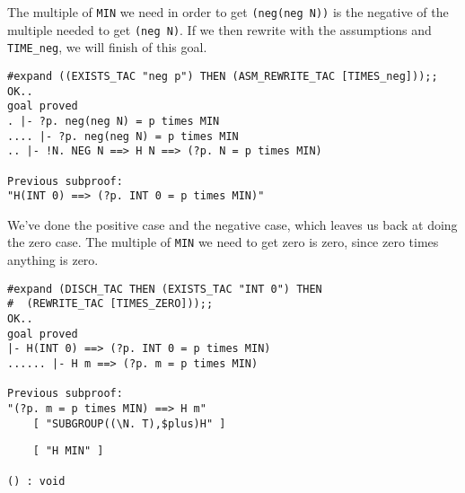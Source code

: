 The multiple of {\small\verb+MIN+} we need in order to get
{\small\verb+(neg(neg N))+} is the negative of the multiple needed to
get {\small\verb+(neg N)+}.  If we then rewrite with the assumptions
and {\small\verb+TIME_neg+}, we will finish of this goal. 
\begin{session}
\begin{verbatim}
#expand ((EXISTS_TAC "neg p") THEN (ASM_REWRITE_TAC [TIMES_neg]));;
OK..
goal proved
. |- ?p. neg(neg N) = p times MIN
.... |- ?p. neg(neg N) = p times MIN
.. |- !N. NEG N ==> H N ==> (?p. N = p times MIN)

Previous subproof:
"H(INT 0) ==> (?p. INT 0 = p times MIN)"
\end{verbatim}
\evdots
\end{session}

We've done the positive case and the negative case, which leaves us
back at doing the zero case.  The multiple of {\small\verb+MIN+} we
need to get zero is zero, since zero times anything is zero.
\begin{session}
\begin{verbatim}
#expand (DISCH_TAC THEN (EXISTS_TAC "INT 0") THEN
#  (REWRITE_TAC [TIMES_ZERO]));;
OK..
goal proved
|- H(INT 0) ==> (?p. INT 0 = p times MIN)
...... |- H m ==> (?p. m = p times MIN)

Previous subproof:
"(?p. m = p times MIN) ==> H m"
    [ "SUBGROUP((\N. T),$plus)H" ]
\end{verbatim}
\mvdots
\begin{verbatim}
    [ "H MIN" ]

() : void
\end{verbatim}
\end{session}

